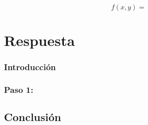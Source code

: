 \item 
        \begin{LARGE}
            \begin{equation*}
                f(x,y) = 
            \end{equation*}
        \end{LARGE}
\section*{Respuesta}
    \subsubsection*{Introducción}

    \subsubsection*{Paso 1:}

\subsection*{Conclusión}